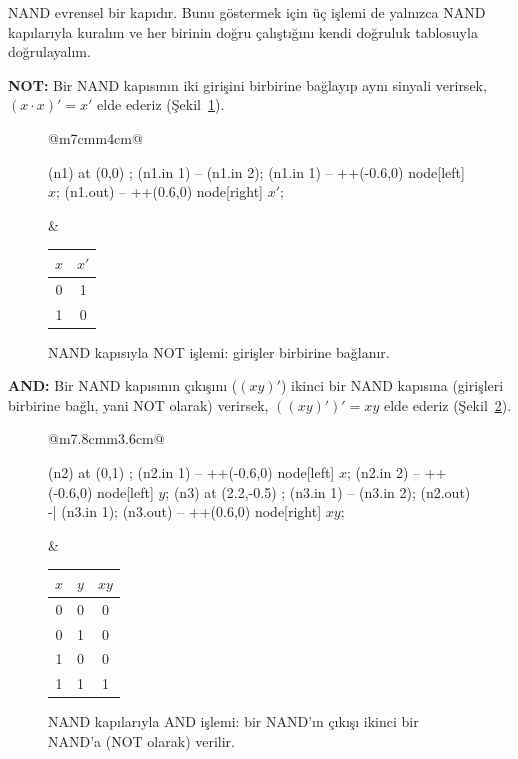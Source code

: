 NAND evrensel bir kapıdır. Bunu göstermek için üç işlemi de yalnızca NAND kapılarıyla
kuralım ve her birinin doğru çalıştığını kendi doğruluk tablosuyla doğrulayalım.

\textbf{NOT:} Bir NAND kapısının iki girişini birbirine bağlayıp aynı sinyali verirsek,
$(x\cdot x)'=x'$ elde ederiz (Şekil~\ref{fig:nand-not}).

\begin{figure}[H]
\centering
\begin{tabular}{@{}m{7cm}m{4cm}@{}}
\begin{circuitikz}[scale=1.3, font=\normalsize]
\node[nand port, number inputs=2] (n1) at (0,0) {};
\draw (n1.in 1) -- (n1.in 2);
\draw (n1.in 1) -- ++(-0.6,0) node[left] {$x$};
\draw (n1.out) -- ++(0.6,0) node[right] {$x'$};
\end{circuitikz}
&
\begin{tabular}{c|c}
\toprule
$x$&$x'$\\
\midrule
0&1\\1&0\\
\bottomrule
\end{tabular}
\end{tabular}
\caption{NAND kapısıyla NOT işlemi: girişler birbirine bağlanır.}
\label{fig:nand-not}
\end{figure}

\textbf{AND:} Bir NAND kapısının çıkışını ($(xy)'$) ikinci bir NAND kapısına (girişleri
birbirine bağlı, yani NOT olarak) verirsek, $((xy)')'=xy$ elde ederiz
(Şekil~\ref{fig:nand-and}).

\begin{figure}[H]
\centering
\begin{tabular}{@{}m{7.8cm}m{3.6cm}@{}}
\begin{circuitikz}[scale=1.3, font=\normalsize]
\node[nand port, number inputs=2] (n2) at (0,1) {};
\draw (n2.in 1) -- ++(-0.6,0) node[left] {$x$};
\draw (n2.in 2) -- ++(-0.6,0) node[left] {$y$};
\node[nand port, number inputs=2] (n3) at (2.2,-0.5) {};
\draw (n3.in 1) -- (n3.in 2);
\draw (n2.out) -| (n3.in 1);
\draw (n3.out) -- ++(0.6,0) node[right] {$xy$};
\end{circuitikz}
&
\begin{tabular}{cc|c}
\toprule
$x$&$y$&$xy$\\
\midrule
0&0&0\\0&1&0\\1&0&0\\1&1&1\\
\bottomrule
\end{tabular}
\end{tabular}
\caption{NAND kapılarıyla AND işlemi: bir NAND'ın çıkışı ikinci bir NAND'a (NOT olarak)
verilir.}
\label{fig:nand-and}
\end{figure}

